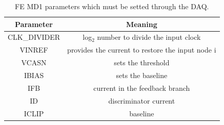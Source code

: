         \begin{table}
            \begin{center}
            \begin{tabular}{|c | c |}
            \hline
            Parameter & Meaning \\
            \hline
            \hline
            CLK\_DIVIDER & log$_2$ number to divide the input clock  \\
            VINREF & provides the current to restore the input node i\\
            VCASN & sets the threshold\\
            IBIAS & sets the baseline\\
            IFB & current in the feedback branch \\
            ID & discriminator current\\
            ICLIP & baseline \\
            \hline
            \end{tabular}
            \caption{FE MD1 parameters which must be setted through the DAQ.}
            \label{tab:FE_ARCADIA-parameters}
            \end{center}
        \end{table}

